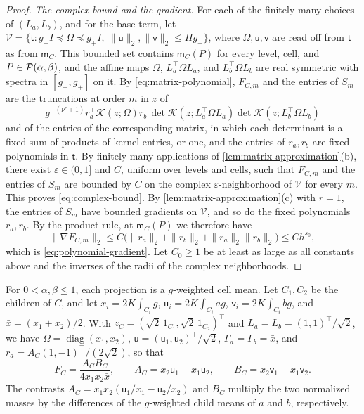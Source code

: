 \begin{proof}
\emph{The complex bound and the gradient.} For each of the finitely many
choices of $(L_a,L_b)$, and for the base term, let
$\mathcal V=\{\mathsf t:g_-I\preceq\Omega\preceq g_+I,\
\|\mathsf u\|_2,\|\mathsf v\|_2\le Hg_+\}$, where $\Omega,\mathsf u,\mathsf v$
are read off from $\mathsf t$ as from $\mathsf m_C$. This bounded set
contains $\mathsf m_C(P)$ for every level, cell, and
$P\in\mathcal P(\alpha,\beta)$, and the affine maps $\Omega$, $L_a^\top\Omega L_a$,
and $L_b^\top\Omega L_b$ are real symmetric with spectra in $[g_-,g_+]$ on
it. By \eqref{eq:matrix-polynomial}, $F_{C,m}$ and the entries of $S_m$
are the truncations at order $m$ in $z$ of
\[
 \bar g^{-(\nu'+1)}r_a^\top\mathcal K(z;\Omega)r_b\,
 \det\mathcal K(z;L_a^\top\Omega L_a)\det\mathcal K(z;L_b^\top\Omega L_b)
\]
and of the entries of the corresponding matrix, in which each determinant
is a fixed sum of products of kernel entries, or one, and the entries of
$r_a,r_b$ are fixed polynomials in $\mathsf t$. By finitely many
applications of \cref{lem:matrix-approximation}(b), there exist
$\varepsilon\in(0,1]$ and $C$, uniform over levels and cells, such that
$F_{C,m}$ and the entries of $S_m$ are bounded by $C$ on the complex
$\varepsilon$-neighborhood of $\mathcal V$ for every $m$. This proves
\eqref{eq:complex-bound}. By \cref{lem:matrix-approximation}(c) with
$r=1$, the entries of $S_m$ have bounded gradients on $\mathcal V$, and so
do the fixed polynomials $r_a,r_b$. By the product rule, at
$\mathsf m_C(P)$ we therefore have
\[
 \|\nabla F_{C,m}\|_2
 \le C\bigl(\|r_a\|_2+\|r_b\|_2+\|r_a\|_2\|r_b\|_2\bigr)\le Ch^{s_0},
\]
which is \eqref{eq:polynomial-gradient}. Let $C_0\ge1$ be at least as
large as all constants above and the inverses of the radii of the complex
neighborhoods.
\end{proof}

For $0<\alpha,\beta\le1$, each projection is a $g$-weighted cell mean.
Let $C_1,C_2$ be the children of $C$, and let $x_i=2K\int_{C_i}g$,
$\mathsf u_i=2K\int_{C_i}ag$, $\mathsf v_i=2K\int_{C_i}bg$, and
$\bar x=(x_1+x_2)/2$. With $z_C=(\sqrt2\,1_{C_1},\sqrt2\,1_{C_2})^\top$ and
$L_a=L_b=(1,1)^\top/\sqrt2$, we have $\Omega=\operatorname{diag}(x_1,x_2)$,
$\mathsf u=(\mathsf u_1,\mathsf u_2)^\top/\sqrt2$,
$\Gamma_a=\Gamma_b=\bar x$, and $r_a=A_C(1,-1)^\top/(2\sqrt2)$, so that
\begin{equation}\label{eq:scalar-increment}
 F_C=\frac{A_CB_C}{4x_1x_2\bar x},\qquad
 A_C=x_2\mathsf u_1-x_1\mathsf u_2,\qquad
 B_C=x_2\mathsf v_1-x_1\mathsf v_2.
\end{equation}
The contrasts $A_C=x_1x_2(\mathsf u_1/x_1-\mathsf u_2/x_2)$ and $B_C$
multiply the two normalized masses by the differences of the $g$-weighted
child means of $a$ and $b$, respectively.

